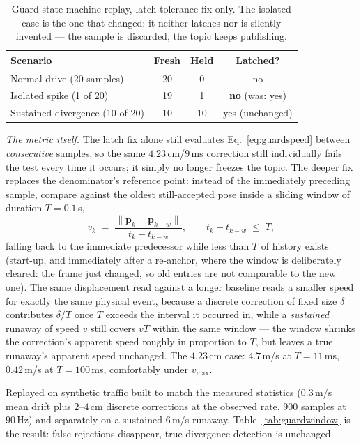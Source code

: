 \begin{table}[htbp]
\centering\small
\begin{tabular}{lccc}
\toprule
Scenario & Fresh & Held & Latched? \\
\midrule
Normal drive (20 samples)          & 20 & 0  & no \\
Isolated spike (1 of 20)           & 19 & 1  & \textbf{no} (was: yes) \\
Sustained divergence (10 of 20)    & 10 & 10 & yes (unchanged) \\
\bottomrule
\end{tabular}
\caption{Guard state-machine replay, latch-tolerance fix only. The isolated
case is the one that changed: it neither latches nor is silently invented ---
the sample is discarded, the topic keeps publishing.}
\label{tab:guardreplay}
\end{table}

\emph{The metric itself.} The latch fix alone still evaluates
Eq.~\ref{eq:guardspeed} between \emph{consecutive} samples, so the same
$4.23$\,cm/$9$\,ms correction still individually fails the test every time it
occurs; it simply no longer freezes the topic. The deeper fix replaces the
denominator's reference point: instead of the immediately preceding sample,
compare against the oldest still-accepted pose inside a sliding window of
duration $T=0.1$\,s,
\begin{equation}
v_k \;=\; \frac{\lVert \mathbf{p}_k - \mathbf{p}_{k-w}\rVert}{t_k - t_{k-w}},
\qquad
t_k - t_{k-w} \;\le\; T ,
\label{eq:guardwindow}
\end{equation}
falling back to the immediate predecessor while less than $T$ of history
exists (start-up, and immediately after a re-anchor, where the window is
deliberately cleared: the frame just changed, so old entries are not
comparable to the new one). The same displacement read against a longer
baseline reads a smaller speed for exactly the same physical event, because a
discrete correction of fixed size $\delta$ contributes $\delta/T$ once $T$
exceeds the interval it occurred in, while a \emph{sustained} runaway of
speed $v$ still covers $vT$ within the same window --- the window shrinks the
correction's apparent speed roughly in proportion to $T$, but leaves a true
runaway's apparent speed unchanged. The $4.23$\,cm case: $4.7$\,m/s at
$T=11$\,ms, $0.42$\,m/s at $T=100$\,ms, comfortably under $v_{\max}$.

Replayed on synthetic traffic built to match the measured statistics ($0.3$\,m/s
mean drift plus $2$--$4$\,cm discrete corrections at the observed rate,
$900$ samples at $90$\,Hz) and separately on a sustained $6$\,m/s runaway,
Table~\ref{tab:guardwindow} is the result: false rejections disappear, true
divergence detection is unchanged.

